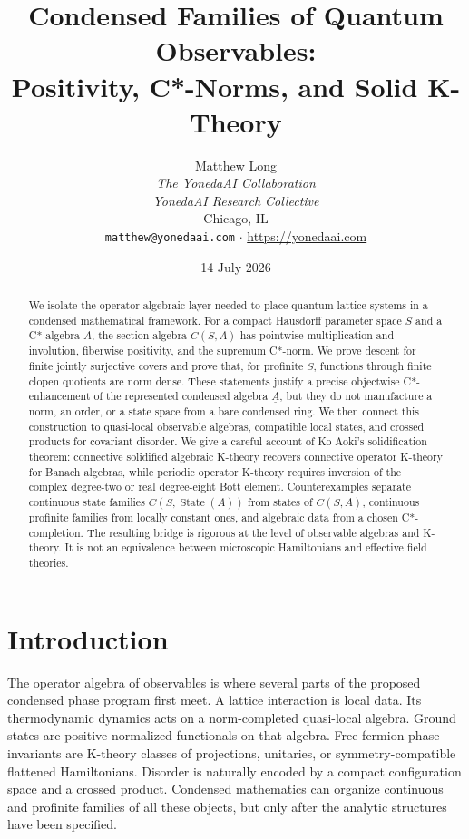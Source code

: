\documentclass[12pt]{article}
\title{Condensed Families of Quantum Observables:\\
Positivity, C*-Norms, and Solid K-Theory}
\author{Matthew Long \\
\textit{The YonedaAI Collaboration} \\
\textit{YonedaAI Research Collective} \\
Chicago, IL \\
\texttt{matthew@yonedaai.com} $\cdot$ \url{https://yonedaai.com}}
\date{14 July 2026}
\theoremstyle{definition}
\theoremstyle{remark}
\newcommand{\State}{\operatorname{State}}
\begin{document}
\maketitle

\begin{abstract}
We isolate the operator algebraic layer needed to place quantum lattice systems in a
condensed mathematical framework.  For a compact Hausdorff parameter space $S$ and
a C*-algebra $A$, the section algebra $C(S,A)$ has pointwise multiplication and
involution, fiberwise positivity, and the supremum C*-norm.  We prove descent for
finite jointly surjective covers and prove that, for profinite $S$, functions through
finite clopen quotients are norm dense.  These statements justify a precise
objectwise C*-enhancement of the represented condensed algebra $\underline A$, but
they do not manufacture a norm, an order, or a state space from a bare condensed
ring.  We then connect this construction to quasi-local observable algebras,
compatible local states, and crossed products for covariant disorder.  We give a
careful account of Ko Aoki's solidification theorem: connective solidified
algebraic K-theory recovers connective operator K-theory for Banach algebras, while
periodic operator K-theory requires inversion of the complex degree-two or real
degree-eight Bott element.  Counterexamples separate continuous state families
$C(S,\State(A))$ from states of $C(S,A)$, continuous profinite families from locally
constant ones, and algebraic data from a chosen C*-completion.  The resulting bridge
is rigorous at the level of observable algebras and K-theory.  It is not an
equivalence between microscopic Hamiltonians and effective field theories.
\end{abstract}

\tableofcontents

\section{Introduction}

The operator algebra of observables is where several parts of the proposed
condensed phase program first meet.  A lattice interaction is local data.  Its
thermodynamic dynamics acts on a norm-completed quasi-local algebra.  Ground states
are positive normalized functionals on that algebra.  Free-fermion phase invariants
are K-theory classes of projections, unitaries, or symmetry-compatible flattened
Hamiltonians.  Disorder is naturally encoded by a compact configuration space and
a crossed product.  Condensed mathematics can organize continuous and profinite
families of all these objects, but only after the analytic structures have been
specified.
\end{document}
